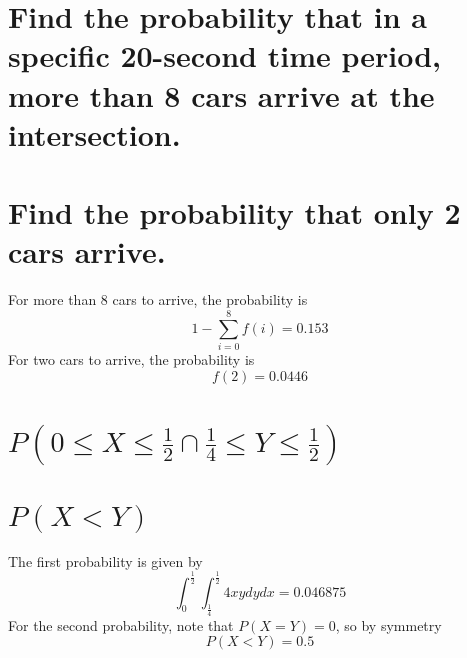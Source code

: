 \documentclass[answers]{exam}
\begin{document}
\begin{questions}

\begin{parts}
\part{Find the probability that in a specific 20-second time period, more than 8 cars arrive at the intersection.}
\part{Find the probability that only 2 cars arrive.}
\end{parts}

\begin{solution}
	For more than 8 cars to arrive, the probability is
	$$1-\sum_{i=0}^8f(i) = 0.153$$
	For two cars to arrive, the probability is
	$$f(2) = 0.0446$$
\end{solution}


\begin{parts}
\part{$P(0\leq X\leq\frac{1}{2}\cap\frac{1}{4}\leq Y\leq\frac{1}{2})$}
\part{$P(X<Y)$}
\end{parts}

\begin{solution}
	The first probability is given by
	$$\int_0^{\frac{1}{2}}\int_{\frac{1}{4}}^{\frac{1}{2}} 4xy dydx = 0.046875$$
	For the second probability, note that $P(X=Y)=0$, so by symmetry
	$$P(X<Y) = 0.5$$
\end{solution}


\end{questions}
\end{document}

